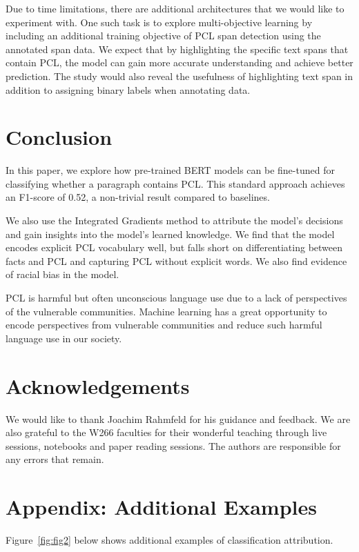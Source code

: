 \documentclass[11pt]{article}
\begin{document}
Due to time limitations, there are additional architectures that we would like to experiment with. One such task is to explore multi-objective learning by including an additional training objective of PCL span detection using the annotated span data. We expect that by highlighting the specific text spans that contain PCL, the model can gain more accurate understanding and achieve better prediction. The study would also reveal the usefulness of highlighting text span in addition to assigning binary labels when annotating data.

\section{Conclusion}

In this paper, we explore how pre-trained BERT models can be fine-tuned for classifying whether a paragraph contains PCL. This standard approach achieves an F1-score of 0.52, a non-trivial result compared to baselines. 

We also use the Integrated Gradients method to attribute the model’s decisions and gain insights into the model’s learned knowledge. We find that the model encodes explicit PCL vocabulary well, but falls short on differentiating between facts and PCL and capturing PCL without explicit words. We also find evidence of racial bias in the model.

PCL is harmful but often unconscious language use due to a lack of perspectives of the vulnerable communities. Machine learning has a great opportunity to encode perspectives from vulnerable communities and reduce such harmful language use in our society.

\section*{Acknowledgements}

We would like to thank Joachim Rahmfeld for his guidance and feedback. We are also grateful to the W266 faculties for their wonderful teaching through live sessions, notebooks and paper reading sessions. The authors are responsible for any errors that remain.



\appendix

\section*{Appendix: Additional Examples}
Figure~\ref{fig:fig2} below shows additional examples of classification attribution. 
\end{document}
